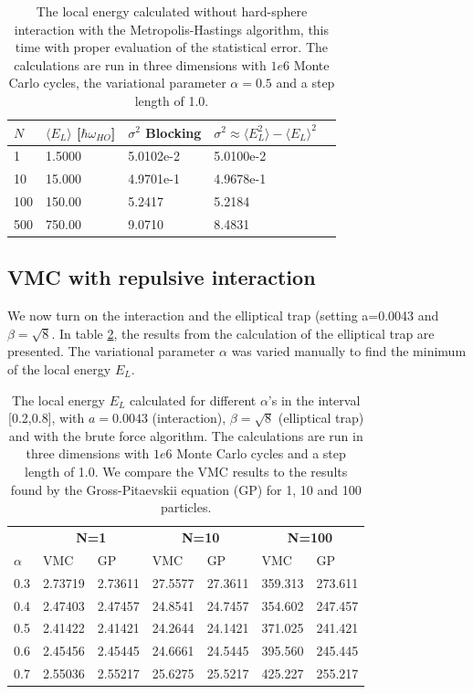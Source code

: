 \documentclass[norsk,a4paper,12pt]{article}
\begin{document}
\begin{table} [H]
	\caption{The local energy calculated without hard-sphere interaction with the Metropolis-Hastings algorithm, this time with proper evaluation of the statistical error. The calculations are run in three dimensions with $1e6$ Monte Carlo cycles, the variational parameter $\alpha=0.5$ and a step length of 1.0.}
	\begin{tabularx}{\textwidth}{X|XXXX} \hline
		\label{tab:variance_analysis}
		$N$ & $\langle E_L\rangle$ [$\hbar\omega_{HO}$] & $\sigma^2$ Blocking & $\sigma^2 \approx \langle E_L^2 \rangle - \langle E_L \rangle^2$ \\ \hline
				1 & 1.5000 & 5.0102e-2  & 5.0100e-2 \\
				10 & 15.000 & 4.9701e-1 & 4.9678e-1  \\
				100 & 150.00 & 5.2417 & 5.2184\\
				500 & 750.00 & 9.0710 & 8.4831 \\ \hline
	\end{tabularx}
\end{table}

\subsection{VMC with repulsive interaction}
We now turn on the interaction and the elliptical trap (setting a=0.0043 and $\beta=\sqrt{8}$. In table \ref{tab:EL_calc_repulsive_pot}, the results from the calculation of the elliptical trap are presented. The variational parameter $\alpha$ was varied manually to find the minimum of the local energy $E_L$.

\begin{table} [H]
	\centering
	\caption{The local energy $E_L$ calculated for different $\alpha$'s in the interval [0.2,0.8], with $a=0.0043$ (interaction), $\beta=\sqrt{8}$ (elliptical trap) and with the brute force algorithm. The calculations are run in three dimensions with $1e6$ Monte Carlo cycles and a step length of 1.0. We compare the VMC results to the results found by the Gross-Pitaevskii equation (GP) for 1, 10 and 100 particles.}
	\begin{tabularx}{\textwidth}{X|XXXXXX} \hline
		\label{tab:EL_calc_repulsive_pot}
		& \multicolumn{2}{c}{\textbf{N=1}} & \multicolumn{2}{c}{\textbf{N=10}} & \multicolumn{2}{c}{\textbf{N=100}} \\
		$\alpha$ & VMC & GP & VMC & GP & VMC & GP  \\ \hline
		0.3 & 2.73719 & 2.73611 & 27.5577 & 27.3611 & 359.313 & 273.611\\
		0.4 & 2.47403 & 2.47457 & 24.8541 & 24.7457 & 354.602 & 247.457\\ 
		0.5 & 2.41422 & 2.41421 & 24.2644 & 24.1421 & 371.025 & 241.421\\ 
		0.6 & 2.45456 & 2.45445 & 24.6661 & 24.5445 & 395.560 & 245.445\\ 
		0.7 & 2.55036 & 2.55217 & 25.6275 & 25.5217 & 425.227 & 255.217\\  \hline
	\end{tabularx}
\end{table}
\end{document}

